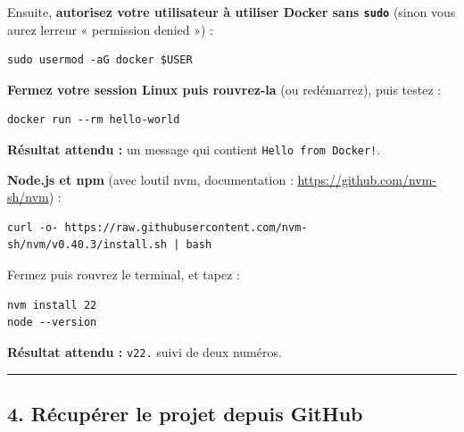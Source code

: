 \documentclass[
  french,
  11pt,
  a4paper,
]{article}
\begin{document}
Ensuite, \textbf{autorisez votre utilisateur à utiliser Docker sans
\texttt{sudo}} (sinon vous aurez l\textquotesingle erreur « permission
denied ») :

\begin{Verbatim}[breaklines=true,breakanywhere=true,fontsize=\small,frame=leftline,framerule=1.6pt,rulecolor=\color{credixblue},framesep=3mm,xleftmargin=2mm,xrightmargin=1mm]
sudo usermod -aG docker $USER
\end{Verbatim}

\textbf{Fermez votre session Linux puis rouvrez-la} (ou redémarrez),
puis testez :

\begin{Verbatim}[breaklines=true,breakanywhere=true,fontsize=\small,frame=leftline,framerule=1.6pt,rulecolor=\color{credixblue},framesep=3mm,xleftmargin=2mm,xrightmargin=1mm]
docker run --rm hello-world
\end{Verbatim}

\textbf{Résultat attendu :} un message qui contient
\texttt{Hello\ from\ Docker!}.

\textbf{Node.js et npm} (avec l\textquotesingle outil nvm, documentation
: \url{https://github.com/nvm-sh/nvm}) :

\begin{Verbatim}[breaklines=true,breakanywhere=true,fontsize=\small,frame=leftline,framerule=1.6pt,rulecolor=\color{credixblue},framesep=3mm,xleftmargin=2mm,xrightmargin=1mm]
curl -o- https://raw.githubusercontent.com/nvm-sh/nvm/v0.40.3/install.sh | bash
\end{Verbatim}

Fermez puis rouvrez le terminal, et tapez :

\begin{Verbatim}[breaklines=true,breakanywhere=true,fontsize=\small,frame=leftline,framerule=1.6pt,rulecolor=\color{credixblue},framesep=3mm,xleftmargin=2mm,xrightmargin=1mm]
nvm install 22
node --version
\end{Verbatim}

\textbf{Résultat attendu :} \texttt{v22.} suivi de deux numéros.

\begin{center}\rule{0.5\linewidth}{0.5pt}\end{center}

\subsection{4. Récupérer le projet depuis
GitHub}\label{4-ruxe9cupuxe9rer-le-projet-depuis-github}
\end{document}
